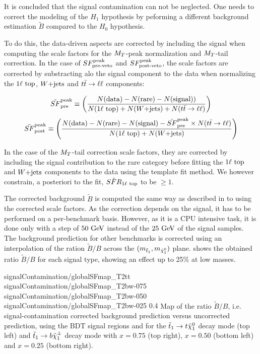         It is concluded that the signal contamination can not be neglected. One needs to correct the modeling
        of the $H_1$ hypothesis by peforming a different background estimation $\tilde{B}$ compared to the
        $H_0$ hypothesis.

        To do this, the data-driven aspects are corrected by including the signal when computing the scale factors for the
        $M_T$-peak normalization and $M_T$-tail correction. In the case of $SF_{\text{pre-veto}}^{\text{peak}}$ and $SF_{\text{post-veto}}^{\text{peak}}$, the scale factors
        are corrected by substracting alo the signal component to the data when normalizing the $1\ell~\text{top}$, $\text{$W$+jets}$
        and $t\bar{t} \rightarrow \ell \ell$ components:

        \begin{equation}
            \tilde{SF}_{\text{pre}}^{\text{peak}} \equiv \left( \frac{N(\text{data}) - N(\text{rare}) - N(\text{signal}))}{N(1\ell~\text{top}) + N(\text{$W$+jets}) + N(t\bar{t} \rightarrow \ell \ell)} \right)
        \end{equation}
        \begin{equation}
            \tilde{SF}_{\text{post}}^{\text{peak}} \equiv \left( \frac{N(\text{data}) - N(\text{rare}) - N(\text{signal}) - \tilde{SF}_{\text{pre}}^{\text{peak}} \times N(t\bar{t} \rightarrow \ell \ell)}{N(1\ell~\text{top}) + N(\text{$W$+jets})} \right)
        \end{equation}

        In the case of the $M_T$-tail correction scale factors, they are corrected by including the signal contribution
        to the rare category before fitting the $1\ell~\text{top}$ and $\text{$W$+jets}$ components to the data using the template
        fit method. We however constrain, a posteriori to the fit, $\tilde{SFR}_{1\ell~\text{top}}$ to be $\geq 1$.

        The corrected background $\tilde{B}$ is computed the same way as described in  to 
        using the corrected scale factors. As the correction depends on the signal, it has to be performed on a per-benchmark
        basis. However, as it is a CPU intensive task, it is done only with a step of $50 ~\text{GeV}$ instead of the $25 ~\text{GeV}$
        of the signal samples. The background prediction for other benchmarks is corrected using an interpolation of
        the ration $\tilde{B}/B$ across the $(m_{\tilde{t}_1},m_{\tilde{\chi}_1^0})$ plane.  shows
        the obtained ratio $\tilde{B}/B$ for each signal type, showing an effect up to 25\% at low masses.

                          {signalContamination/globalSFmap_T2tt}
                          {signalContamination/globalSFmap_T2bw-075}
                          {signalContamination/globalSFmap_T2bw-050}
                          {signalContamination/globalSFmap_T2bw-025}
                          {0.4}
                          {Map of the ratio $\tilde{B}/B$, i.e. signal-contamination corrected background prediction versus uncorrected prediction, using the BDT signal regions and for the $\tilde{t}_1 \rightarrow t \tilde{\chi}_1^0$ decay mode (top left) and $\tilde{t}_1 \rightarrow b \tilde{\chi}_1^\pm$ decay mode with $x=0.75$ (top right), $x=0.50$ (bottom left) and $x=0.25$ (bottom right).}

